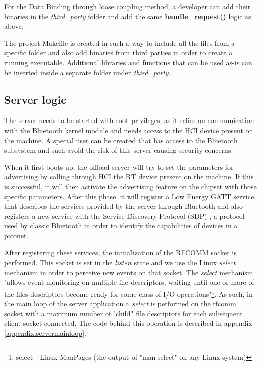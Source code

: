 For the Data Binding through loose coupling method, a developer can add their binaries in the \textit{third_party} folder and add the same \textbf{handle_request()} logic as above.

The project Makefile is created in such a way to include all the files from a specific folder and also add binaries from third parties in order to create a running executable. Additional libraries and functions that can be used as-is can be inserted inside a separate folder under \textit{third_party}.


\subsection{Server logic}
\label{subsection:serverlogic}

The server needs to be started with root privileges, as it relies on communication with the Bluetooth kernel module and needs access to the HCI device present on the machine. A special user can be created that has access to the Bluetooth subsystem and such avoid the risk of this server causing security concerns.

When it first boots up, the offload server will try to set the parameters for advertising by calling through HCI the BT device present on the machine. If this is successful, it will then activate the advertising feature on the chipset with those specific parameters. After this phase, it will register a Low Energy GATT service that describes the services provided by the server through Bluetooth and also registers a new service with the Service Discovery Protocol (SDP) , a protocol used by classic Bluetooth in order to identify the capabilities of devices in a piconet.

After registering these services, the initialization of the RFCOMM socket is performed. This socket is set in the \textit{listen} state and we use the Linux \textit{select}\cite{ostrowski2000mechanism} mechanism in order to perceive new events on that socket. The \textit{select} mechanism "allows event monitoring on multiple file descriptors, waiting until one or more of the files descriptors become ready for some class of I/O operations"\footnote{select - Linux ManPages (the output of "man select" on any Linux system)}. As such, in the main loop of the server application a \textit{select} is performed on the rfcomm socket with a maximum number of "child" file descriptors for each subsequent client socket connected. The code behind this operation is described in appendix \ref{appendix:servermainloop}.


